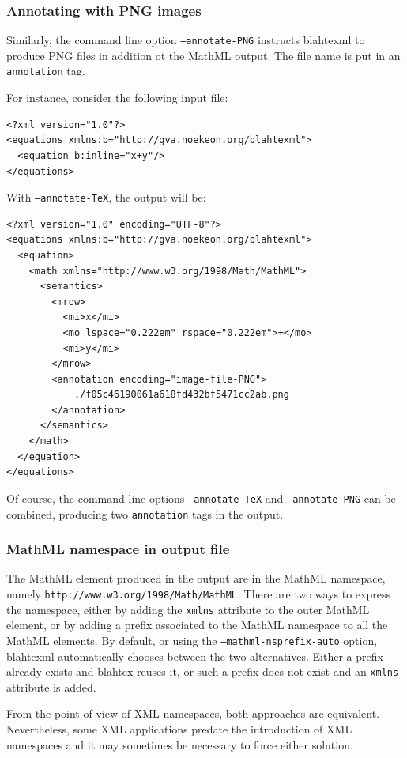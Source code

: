 \documentclass{article}
\begin{document}
\subsubsection{Annotating with PNG images}

Similarly, the command line option \texttt{--annotate-PNG} instructs blahtexml to produce PNG files in addition ot the MathML output. The file name is put in an \texttt{annotation} tag.

For instance, consider the following input file:
\begin{verbatim}
<?xml version="1.0"?>
<equations xmlns:b="http://gva.noekeon.org/blahtexml">
  <equation b:inline="x+y"/>
</equations>
\end{verbatim}
With \texttt{--annotate-TeX}, the output will be:
\begin{verbatim}
<?xml version="1.0" encoding="UTF-8"?>
<equations xmlns:b="http://gva.noekeon.org/blahtexml">
  <equation>
    <math xmlns="http://www.w3.org/1998/Math/MathML">
      <semantics>
        <mrow>
          <mi>x</mi>
          <mo lspace="0.222em" rspace="0.222em">+</mo>
          <mi>y</mi>
        </mrow>
        <annotation encoding="image-file-PNG">
            ./f05c46190061a618fd432bf5471cc2ab.png
        </annotation>
      </semantics>
    </math>
  </equation>
</equations>
\end{verbatim}

Of course, the command line options \texttt{--annotate-TeX} and \texttt{--annotate-PNG} can be combined, producing two \texttt{annotation} tags in the output.

\subsubsection{MathML namespace in output file}

The MathML element produced in the output are in the MathML namespace, namely \texttt{http://www.w3.org/1998/Math/MathML}. There are two ways to express the namespace, either by adding the \texttt{xmlns} attribute to the outer MathML element, or by adding a prefix associated to the MathML namespace to all the MathML elements. By default, or using the \texttt{--mathml-nsprefix-auto} option, blahtexml automatically chooses between the two alternatives. Either a prefix already exists and blahtex reuses it, or such a prefix does not exist and an \texttt{xmlns} attribute is added.

From the point of view of XML namespaces, both approaches are equivalent. Nevertheless, some XML applications predate the introduction of XML namespaces and it may sometimes be necessary to force either solution.
\end{document}
